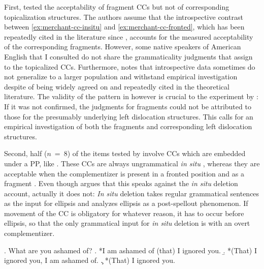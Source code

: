 First, \citet{merchant.etal2013} tested the acceptability of fragment CCs but not of corresponding topicalization structures. The authors assume that the introspective contrast between \ref{ex:merchant-cc-insitu} and \ref{ex:merchant-cc-fronted}, which has been repeatedly cited in the literature since \citet{stowell1981}, accounts for the measured acceptability of the corresponding fragments. However, some native speakers of American English that I consulted do not share the grammaticality judgments that \citet{merchant.etal2013} assign to the topicalized CCs. Furthermore, \citet{featherston2007} notes that introspective data sometimes do not generalize to a larger population and withstand empirical investigation despite of being widely agreed on and repeatedly cited in the theoretical literature. The validity of the pattern in \LLast however is crucial to the experiment by \citet{merchant.etal2013}: If it was not confirmed, the judgments for fragments could not be attributed to those for the presumably underlying left dislocation structures. This calls for an empirical investigation of both the fragments and corresponding left dislocation structures.

Second, half ($n$~=~8) of the items tested by \citet{merchant.etal2013} involve CCs which are embedded under a PP, like \Next. These CCs are always ungrammatical \textit{in situ} \Next[a], whereas they are acceptable when the complementizer is present in a fronted position \Next[b] and as a fragment \Next[c]. Even though \citet{merchant2004} argues that this speaks against the \textit{in situ} deletion account, actually it does not: \textit{In situ} deletion takes regular grammatical sentences as the input for ellipsis and analyzes ellipsis as a post-spellout phenomenon. If movement of the CC is obligatory for whatever reason, it has to occur before ellipsis, so that the only grammatical input for \textit{in situ} deletion is \Next[b] with an overt complementizer.
\newpage

\ex. What are you ashamed of?
\a. *I am ashamed of (that) I ignored you.
\b. *(That) I ignored you, I am ashamed of.
\c. *(That) I ignored you.

